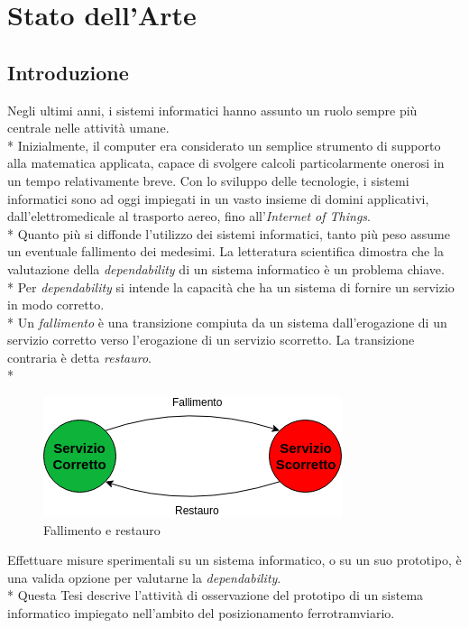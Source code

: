 \chapter{Stato dell'Arte}
\section{Introduzione}
Negli ultimi anni, i sistemi informatici hanno assunto un ruolo sempre pi\`u centrale nelle attivit\`a umane.\\*
Inizialmente, il computer era considerato un semplice strumento di supporto alla matematica applicata, capace di svolgere calcoli particolarmente onerosi in un tempo relativamente breve. Con lo sviluppo delle tecnologie, i sistemi informatici sono ad oggi impiegati in un vasto insieme di domini applicativi, dall'elettromedicale al trasporto aereo, fino all'\emph{Internet of Things}.\\*
Quanto pi\`u si diffonde l'utilizzo dei sistemi informatici, tanto pi\`u peso assume un eventuale fallimento dei medesimi. La letteratura scientifica dimostra che la valutazione della \emph{dependability} di un sistema informatico \`e un problema chiave.\\*
Per \emph{dependability} si intende la capacit\`a che ha un sistema di fornire un servizio in modo corretto. \cite{depdef}\\*
Un \emph{fallimento} \`e una transizione compiuta da un sistema dall'erogazione di un servizio corretto verso l'erogazione di un servizio scorretto. La transizione contraria \`e detta \emph{restauro}.\\*
\begin{figure}[h]
	\centering
	\includegraphics[width=0.7\linewidth]{img/FallimentoRestauro}
	\caption{Fallimento e restauro}
	\label{fig:fallimentorestauro}
\end{figure}\newpage
Effettuare misure sperimentali su un sistema informatico, o su un suo prototipo, \`e una valida opzione per valutarne la \emph{dependability}.\\*
Questa Tesi descrive l'attivit\`a di osservazione del prototipo di un sistema informatico impiegato nell'ambito del posizionamento ferrotramviario.
